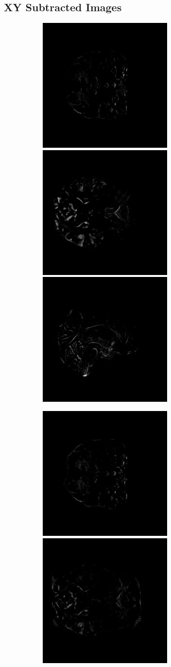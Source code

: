 \documentclass[12pt, fleqn, titlepage]{article}
\newcommand\skipperer{0.45pt}
\newcommand\ripperer{1.25pt}
\newcommand{\1}[1]{\mathds{1}\left[#1\right]}
\begin{document}
\subsection{XY Subtracted Images}\label{xy_subtracted_images}
\begin{figure}[H]
	\centering
	\begin{subfigure}[b]{0.8\textwidth}
		\centering
		\includegraphics[width=0.22\linewidth]{imgs/subtracted_images/xy/002_S_0559_xy_gts_comparison}
		\hskip\skipperer
		\includegraphics[width=0.22\linewidth]{imgs/subtracted_images/xy/002_S_0559_xz_gts_comparison}
		\hskip\skipperer
		\includegraphics[width=0.22\linewidth]{imgs/subtracted_images/xy/002_S_0559_yz_gts_comparison}
	\end{subfigure}
	\vskip\ripperer
	\begin{subfigure}[b]{0.8\textwidth}
		\centering
		\includegraphics[width=0.22\linewidth]{imgs/subtracted_images/xy/002_S_0559_xy_1.5_1.5gen_comparison}
		\hskip\skipperer
		\includegraphics[width=0.22\linewidth]{imgs/subtracted_images/xy/002_S_0559_xz_1.5_1.5gen_comparison}

\end{subfigure}
\end{figure}
\end{document}
